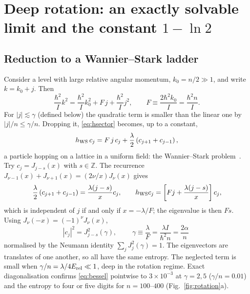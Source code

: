 \documentclass[preprint,12pt]{elsarticle}
\newcommand{\Erel}{E_{\rm rel}}
\begin{document}
\section{Deep rotation: an exactly solvable limit and the constant $1-\ln2$}
\label{sec:rotation}

\subsection{Reduction to a Wannier--Stark ladder}

Consider a level with large relative angular momentum, $k_{0}=n/2\gg1$, and
write $k=k_{0}+j$. Then
\begin{equation}
\frac{\hbar^{2}}{I}k^{2}=\frac{\hbar^{2}}{I}k_{0}^{2}+F\,j+\frac{\hbar^{2}}{I}j^{2},
\qquad F\equiv\frac{2\hbar^{2}k_{0}}{I}=\frac{\hbar^{2}n}{I}.
\end{equation}
For $|j|\lesssim\gamma$ (defined below) the quadratic term is smaller than the
linear one by $|j|/n\le\gamma/n$. Dropping it, \eqref{eq:hsector} becomes, up to
a constant,
\begin{equation}
h_{\rm WS}\,c_{j}=F\,j\,c_{j}+\frac{\lambda}{2}\left(c_{j+1}+c_{j-1}\right),
\label{eq:WS}
\end{equation}
a particle hopping on a lattice in a uniform field: the Wannier--Stark
problem~\cite{Wannier,Fukuyama}. Try $c_{j}=J_{j-s}(x)$ with $s\in\mathbb{Z}$.
The recurrence $J_{\nu-1}(x)+J_{\nu+1}(x)=(2\nu/x)J_{\nu}(x)$ gives
\begin{equation}
\frac{\lambda}{2}\left(c_{j+1}+c_{j-1}\right)
=\frac{\lambda(j-s)}{x}c_{j},\qquad
h_{\rm WS}c_{j}=\left[Fj+\frac{\lambda(j-s)}{x}\right]c_{j},
\end{equation}
which is independent of $j$ if and only if $x=-\lambda/F$; the eigenvalue is
then $Fs$. Using $J_{\nu}(-x)=(-1)^{\nu}J_{\nu}(x)$,
\begin{equation}
|c_{j}|^{2}=J_{j-s}^{2}(\gamma),\qquad
\boxed{\;\gamma\equiv\frac{\lambda}{F}=\frac{\lambda I}{\hbar^{2}n}
=\frac{2\alpha}{n}\;}
\label{eq:bessel}
\end{equation}
normalised by the Neumann identity $\sum_{j}J_{j}^{2}(\gamma)=1$. The
eigenvectors are translates of one another, so all have the same entropy. The
neglected term is small when $\gamma/n=\lambda/4\Erel\ll1$, deep in the
rotation regime. Exact diagonalisation confirms \eqref{eq:bessel} pointwise to
$3\times10^{-3}$ at $\gamma=2,5$ ($\gamma/n=0.01$) and the entropy to four or
five digits for $n=100$--$400$ (Fig.~\ref{fig:rotation}a).
\end{document}
